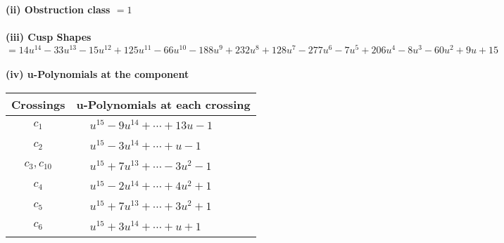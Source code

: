 \documentclass[1p]{elsarticle_modified}
\theoremstyle{definition}
\begin{document}
\flushleft \textbf{(ii) Obstruction class $= 1$}\\~\\
\flushleft \textbf{(iii) Cusp Shapes $= 14 u^{14}-33 u^{13}-15 u^{12}+125 u^{11}-66 u^{10}-188 u^9+232 u^8+128 u^7-277 u^6-7 u^5+206 u^4-8 u^3-60 u^2+9 u+15$}\\~\\
\newpage\renewcommand{\arraystretch}{1}
\flushleft \textbf{(iv) u-Polynomials at the component}\newline \\
\begin{tabular}{m{50pt}|m{274pt}}
Crossings & \hspace{64pt}u-Polynomials at each crossing \\
\hline $$\begin{aligned}c_{1}\end{aligned}$$&$\begin{aligned}
&u^{15}-9 u^{14}+\cdots+13 u-1
\end{aligned}$\\
\hline $$\begin{aligned}c_{2}\end{aligned}$$&$\begin{aligned}
&u^{15}-3 u^{14}+\cdots+u-1
\end{aligned}$\\
\hline $$\begin{aligned}c_{3},c_{10}\end{aligned}$$&$\begin{aligned}
&u^{15}+7 u^{13}+\cdots-3 u^2-1
\end{aligned}$\\
\hline $$\begin{aligned}c_{4}\end{aligned}$$&$\begin{aligned}
&u^{15}-2 u^{14}+\cdots+4 u^2+1
\end{aligned}$\\
\hline $$\begin{aligned}c_{5}\end{aligned}$$&$\begin{aligned}
&u^{15}+7 u^{13}+\cdots+3 u^2+1
\end{aligned}$\\
\hline $$\begin{aligned}c_{6}\end{aligned}$$&$\begin{aligned}
&u^{15}+3 u^{14}+\cdots+u+1
\end{aligned}$\\

\end{tabular}
\end{document}
